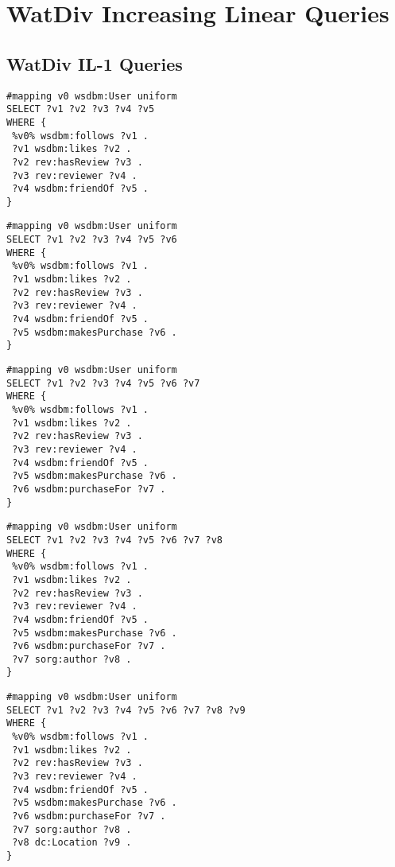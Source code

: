 \section{WatDiv Increasing Linear Queries} 
\label{queries:watdivil} 

\subsection{WatDiv IL-1 Queries} 

\begin{lstlisting}[caption={IL-1-5},label=query:IL-1-5]
#mapping v0 wsdbm:User uniform
SELECT ?v1 ?v2 ?v3 ?v4 ?v5
WHERE {
 %v0% wsdbm:follows ?v1 .
 ?v1 wsdbm:likes ?v2 .
 ?v2 rev:hasReview ?v3 .
 ?v3 rev:reviewer ?v4 .
 ?v4 wsdbm:friendOf ?v5 .
}
\end{lstlisting}

\begin{lstlisting}[caption={IL-1-7},label=query:IL-1-6]
#mapping v0 wsdbm:User uniform
SELECT ?v1 ?v2 ?v3 ?v4 ?v5 ?v6
WHERE {
 %v0% wsdbm:follows ?v1 .
 ?v1 wsdbm:likes ?v2 .
 ?v2 rev:hasReview ?v3 .
 ?v3 rev:reviewer ?v4 .
 ?v4 wsdbm:friendOf ?v5 .
 ?v5 wsdbm:makesPurchase ?v6 .
}
\end{lstlisting}

\begin{lstlisting}[caption={IL-1-7},label=query:IL-1-7]
#mapping v0 wsdbm:User uniform
SELECT ?v1 ?v2 ?v3 ?v4 ?v5 ?v6 ?v7
WHERE {
 %v0% wsdbm:follows ?v1 .
 ?v1 wsdbm:likes ?v2 .
 ?v2 rev:hasReview ?v3 .
 ?v3 rev:reviewer ?v4 .
 ?v4 wsdbm:friendOf ?v5 .
 ?v5 wsdbm:makesPurchase ?v6 .
 ?v6 wsdbm:purchaseFor ?v7 .
}
\end{lstlisting}

\begin{lstlisting}[caption={IL-1-8},label=query:IL-1-8]
#mapping v0 wsdbm:User uniform
SELECT ?v1 ?v2 ?v3 ?v4 ?v5 ?v6 ?v7 ?v8
WHERE {
 %v0% wsdbm:follows ?v1 .
 ?v1 wsdbm:likes ?v2 .
 ?v2 rev:hasReview ?v3 .
 ?v3 rev:reviewer ?v4 .
 ?v4 wsdbm:friendOf ?v5 .
 ?v5 wsdbm:makesPurchase ?v6 .
 ?v6 wsdbm:purchaseFor ?v7 .
 ?v7 sorg:author ?v8 .
}
\end{lstlisting}

\begin{lstlisting}[caption={IL-1-9},label=query:IL-1-9]
#mapping v0 wsdbm:User uniform
SELECT ?v1 ?v2 ?v3 ?v4 ?v5 ?v6 ?v7 ?v8 ?v9
WHERE {
 %v0% wsdbm:follows ?v1 .
 ?v1 wsdbm:likes ?v2 .
 ?v2 rev:hasReview ?v3 .
 ?v3 rev:reviewer ?v4 .
 ?v4 wsdbm:friendOf ?v5 .
 ?v5 wsdbm:makesPurchase ?v6 .
 ?v6 wsdbm:purchaseFor ?v7 .
 ?v7 sorg:author ?v8 .
 ?v8 dc:Location ?v9 .
}
\end{lstlisting}

